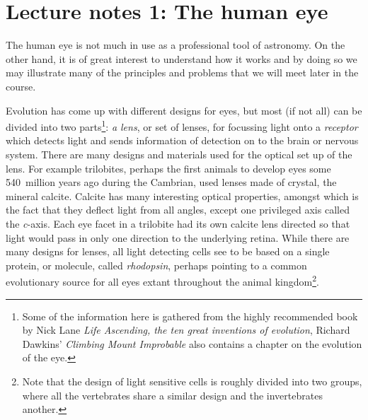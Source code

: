 %
\section{Lecture notes 1: The human eye}

The human eye is not much in use as a professional tool of
astronomy. On the other hand, it is of great interest to understand how it
works and by doing so we may illustrate many of the principles and
problems that we will meet later in the course.

Evolution has come up with different designs for eyes, but most (if
not all) can be divided into two parts\footnote{Some of the
  information here is gathered from the highly recommended book by
  Nick Lane {\it Life Ascending, the ten great inventions of
    evolution}, Richard Dawkins' {\it Climbing Mount
    Improbable} also contains a chapter on the evolution of the eye.}:
{\it a lens}, or set of lenses, for
focussing light onto a {\it receptor} which detects light and sends
information of detection on to the brain or nervous system. There are
many designs and materials used for the optical set up of the
lens. For example trilobites, perhaps the first animals to develop
eyes some 540~million years ago during the Cambrian, used lenses made
of crystal, the mineral calcite. Calcite has many interesting optical
properties, amongst which is the fact that they deflect light from all
angles, except one privileged axis called the {\it c}-axis. Each eye
facet in a trilobite had its own calcite lens directed so that light
would pass in only one direction to the underlying retina. While there
are many designs for lenses, all light detecting cells see to be based
on a single protein, or molecule, called {\it rhodopsin}, perhaps
pointing to a common evolutionary source for all eyes extant
throughout the animal kingdom\footnote{Note that the design
  of light sensitive cells is roughly divided into two groups, where
  all the vertebrates share a similar design and the invertebrates another.}.

